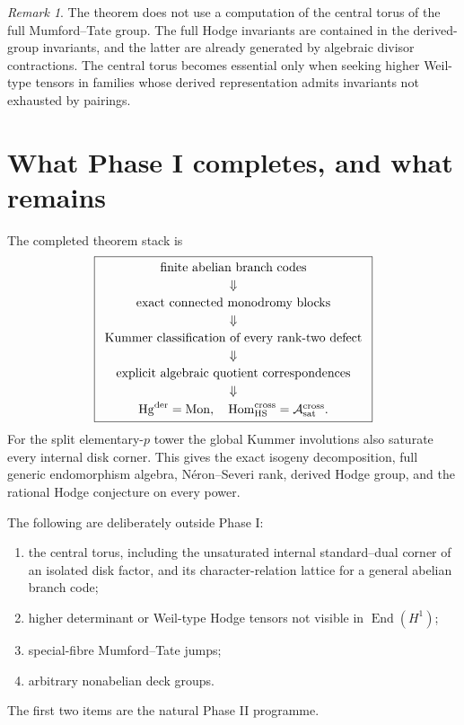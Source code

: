 \documentclass[11pt]{article}
\theoremstyle{definition}
\theoremstyle{remark}
\newtheorem{remark}[theorem]{Remark}
\newcommand{\Mon}{\operatorname{Mon}}
\newcommand{\Hg}{\operatorname{Hg}}
\newcommand{\End}{\operatorname{End}}
\newcommand{\Hom}{\operatorname{Hom}}
\begin{document}
\begin{remark}
The theorem does not use a computation of the central torus of the full Mumford--Tate group.  The full Hodge invariants are contained in the derived-group invariants, and the latter are already generated by algebraic divisor contractions.  The central torus becomes essential only when seeking higher Weil-type tensors in families whose derived representation admits invariants not exhausted by pairings.
\end{remark}

\section{What Phase I completes, and what remains}

The completed theorem stack is
\[
 \boxed{
 \begin{array}{c}
 \text{finite abelian branch codes}\\[2pt]
 \Downarrow\\[2pt]
 \text{exact connected monodromy blocks}\\[2pt]
 \Downarrow\\[2pt]
 \text{Kummer classification of every rank-two defect}\\[2pt]
 \Downarrow\\[2pt]
 \text{explicit algebraic quotient correspondences}\\[2pt]
 \Downarrow\\[2pt]
 \Hg^{\rm der}=\Mon,
 \quad \Hom_{\rm HS}^{\rm cross}=\mathcal A_{\rm sat}^{\rm cross}.
 \end{array}}
\]
For the split elementary-$p$ tower the global Kummer involutions also saturate every internal disk corner.  This gives the exact isogeny decomposition, full generic endomorphism algebra, N\'eron--Severi rank, derived Hodge group, and the rational Hodge conjecture on every power.

The following are deliberately outside Phase I:
\begin{enumerate}
\item the central torus, including the unsaturated internal standard--dual corner of an isolated disk factor, and its character-relation lattice for a general abelian branch code;
\item higher determinant or Weil-type Hodge tensors not visible in $\End(H^1)$;
\item special-fibre Mumford--Tate jumps;
\item arbitrary nonabelian deck groups.
\end{enumerate}
The first two items are the natural Phase II programme.
\end{document}

